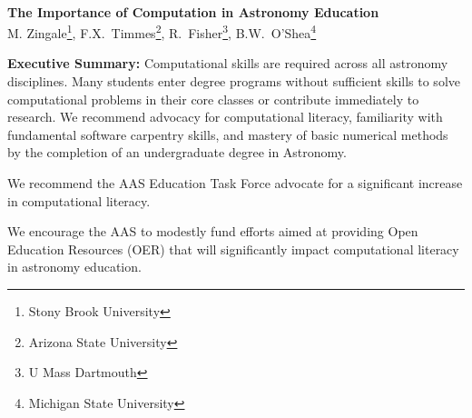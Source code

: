 \documentclass[11pt]{article}
\begin{document}
\thispagestyle{plain}

\mbox{ }\vspace{-0.7in}

\begin{center}
{\Large \sffamily \bfseries The Importance of Computation in Astronomy Education} \\
{
M. Zingale\footnote{Stony Brook University},
F.X.~Timmes\footnote{Arizona State University},
R.~Fisher\footnote{U Mass Dartmouth},
B.W.~O'Shea\footnote{Michigan State University}
}
\end{center}

\begin{tcolorbox}
{\sffamily \bfseries Executive Summary:} Computational skills are required
across all astronomy disciplines. 
Many students enter degree programs without sufficient skills
to solve computational problems in their core classes or contribute immediately to research. 
We recommend advocacy for computational literacy, familiarity with fundamental
software carpentry skills, and mastery of basic numerical methods by the
completion of an undergraduate degree in Astronomy.  

\vspace {0.1in} We recommend the AAS Education Task Force advocate for
a significant increase in computational literacy.

\vspace {0.1in} We encourage the AAS to modestly fund efforts aimed at
providing Open Education Resources (OER) that will significantly
impact computational literacy in astronomy education.






\end{tcolorbox}
\end{document}
